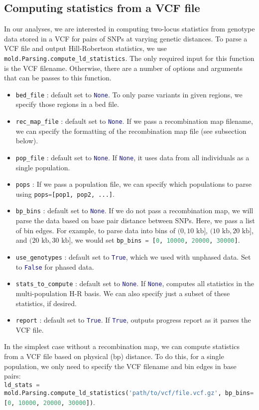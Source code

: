 \documentclass[10pt]{article}
\makeatletter
\newcommand{\py}[1]{\lstinline[breaklines=true,language=Python, showstringspaces=False]@#1@}
\makeatother
\begin{document}
\subsection{Computing statistics from a VCF file}

In our analyses, we are interested in computing two-locus statistics from genotype data stored in a VCF for pairs of SNPs at varying genetic distances.
To parse a VCF file and output Hill-Robertson statistics, we use \py{mold.Parsing.compute_ld_statistics}.
The only required input for this function is the VCF filename.
Otherwise, there are a number of options and arguments that can be passes to this function.
\begin{itemize}
\item \py{bed_file} : default set to \py{None}. To only parse variants in given regions, we specify those regions in a bed file.
\item \py{rec_map_file} : default set to \py{None}. If we pass a recombination map filename, we can specify the formatting of the recombination map file (see subsection below).
\item \py{pop_file} : default set to \py{None}. If \py{None}, it uses data from all individuals as a single population. 
\item \py{pops} : If we pass a population file, we can specify which populations to parse using \py{pops=[pop1, pop2, ...]}.
\item \py{bp_bins} : default set to \py{None}. If we do not pass a recombination map, we will parse the data based on base pair distance between SNPs. Here, we pass a list of bin edges. For example, to parse data into bins of $(0,10\text{ kb}]$, $(10\text{ kb},20\text{ kb}]$, and $(20\text{ kb},30\text{ kb}]$, we would set \py{bp_bins = [0, 10000, 20000, 30000]}.
\item \py{use_genotypes} : default set to \py{True}, which we used with unphased data. Set to \py{False} for phased data.
\item \py{stats_to_compute} : default set to \py{None}. If \py{None}, computes all statistics in the multi-population H-R basis. We can also specify just a subset of these statistics, if desired.
\item \py{report} : default set to \py{True}. If \py{True}, outputs progress report as it parses the VCF file.
\end{itemize}

In the simplest case without a recombination map, we can compute statistics from a VCF file based on physical (bp) distance.
To do this, for a single population, we only need to specify the VCF filename and bin edges in base pairs:\\
\py{ld_stats = mold.Parsing.compute_ld_statistics('path/to/vcf/file.vcf.gz', bp_bins=[0, 10000, 20000, 30000])}.
\end{document}
